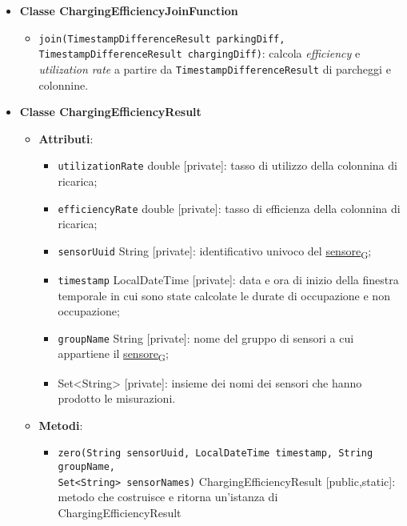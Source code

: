 \begin{itemize}
\begin{itemize}
\begin{itemize}
		            \end{itemize}
	      \end{itemize}
	\item \textbf{Classe ChargingEfficiencyJoinFunction}
	      \begin{itemize}
		      \item \texttt{join(TimestampDifferenceResult parkingDiff, \\TimestampDifferenceResult chargingDiff)}: calcola \textit{efficiency} e \textit{utilization rate} a partire da \texttt{TimestampDifferenceResult}
		            di parcheggi e colonnine.
	      \end{itemize}
	\item \textbf{Classe ChargingEfficiencyResult}

	      \begin{itemize}
		      \item \textbf{Attributi}:
		            \begin{itemize}
			            \item \texttt{utilizationRate} double [private]: tasso di utilizzo della colonnina di ricarica;
			            \item \texttt{efficiencyRate} double [private]: tasso di efficienza della colonnina di ricarica;
			            \item \texttt{sensorUuid} String [private]: identificativo univoco del \href{https://7last.github.io/docs/pb/documentazione-interna/glossario\#sensore}{sensore\textsubscript{G}};
			            \item \texttt{timestamp} LocalDateTime [private]: data e ora di inizio della finestra temporale in cui sono state calcolate le durate di occupazione e non occupazione;
			            \item \texttt{groupName} String [private]: nome del gruppo di sensori a cui appartiene il \href{https://7last.github.io/docs/pb/documentazione-interna/glossario\#sensore}{sensore\textsubscript{G}};
			            \item \texttt{} Set<String> [private]: insieme dei nomi dei sensori che hanno prodotto le misurazioni.
		            \end{itemize}
		      \item \textbf{Metodi}:
		            \begin{itemize}
			            \item \texttt{zero(String sensorUuid, LocalDateTime timestamp, String groupName,}\\
			                  \texttt{Set<String> sensorNames)} ChargingEfficiencyResult [public,static]: metodo che costruisce e ritorna un'istanza di ChargingEfficiencyResult

\end{itemize}
\end{itemize}
\end{itemize}
